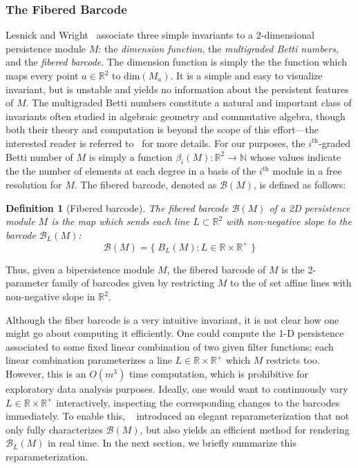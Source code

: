 \documentclass{article} %
\newtheorem{definition}{Definition}
\begin{document}
\subsubsection*{The Fibered Barcode}
Lesnick and Wright~\cite{lesnick2015interactive} associate three simple invariants to a 2-dimensional persistence module $M$: the \emph{dimension function}, the \emph{multigraded Betti numbers}, and the \emph{fibered barcode}. 
The dimension function is simply the the function which maps every point $a \in \mathbb{R}^2$ to $\mathrm{dim}(M_a)$. It is a simple and easy to visualize invariant, but is unstable and yields no information about the persistent features of $M$. 
The multigraded Betti numbers constitute a natural and important class of invariants often studied in algebraic geometry and commutative algebra, though both their theory and computation is beyond the scope of this effort---the interested reader is referred to~\cite{lesnick2015interactive, carlsson2009theory} for more details. For our purposes, the $i^{\text{th}}$-graded Betti number of $M$ is simply a function $\beta_i(M): \mathbb{R}^2 \to \mathbb{N}$ whose values indicate the the number of elements at  each degree in a basis of the $i^{\text{th}}$ module in a free resolution for $M$. 
The fibered barcode, denoted as $\mathcal{B}(M)$, is defined as follows: 
\begin{definition}[Fibered barcode]
	The fibered barcode $\mathcal{B}(M)$ of a 2D persistence module $M$ is the map which sends each line  $L \subset \mathbb{R}^2$ with non-negative slope to the barcode $\mathcal{B}_L(M)$: 
$$ \mathcal{B}(M) = \{ \; B_L(M) : L \in \mathbb{R} \times \mathbb{R}^{+} \; \}$$
\end{definition} 
\noindent Thus, given a bipersistence module $M$, the fibered barcode of $M$ is the 2-parameter family of barcodes given by restricting $M$ to the of set affine lines with non-negative slope in $\mathbb{R}^2$. 

Although the fiber barcode is a very intuitive invariant, it is not clear how one might go about computing it efficiently. 
One could compute the 1-D persistence associated to some fixed linear combination of two given filter functions; each linear combination parameterizes a line $L \in \mathbb{R} \times \mathbb{R}^{+}$ which $M$ restricts too. 
However, this is an $O(m^3)$ time computation, which is prohibitive for exploratory data analysis purposes. 
Ideally, one would want to continuously vary $L \in \mathbb{R} \times \mathbb{R}^{+}$ interactively, inspecting the corresponding changes to the barcodes immediately. To enable this, ~\cite{lesnick2015interactive} introduced an elegant reparameterization that not only fully characterizes $\mathcal{B}(M)$, but also yields an efficient method for rendering $\mathcal{B}_L(M)$ in real time. In the next section, we briefly summarize this reparameterization. 
\end{document}

